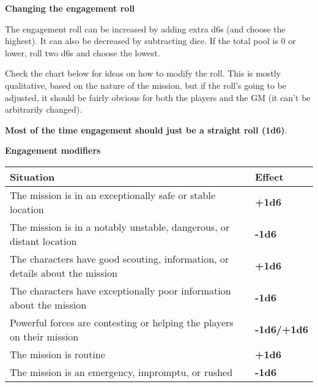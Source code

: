 \begin{center}
    \textbf{Changing the engagement roll}
\end{center}

The engagement roll can be increased by adding extra d6s (and choose the highest). It can also
be decreased by subtracting dice. If the total pool is 0 or lower, roll two d6s and choose the
lowest.

Check the chart below for ideas on how to modify the roll. This is mostly qualitative, based on
the nature of the mission, but if the roll’s going to be adjusted, it should be fairly obvious for both
the players and the GM (it can’t be arbitrarily changed).

\textbf{Most of the time engagement should just be a straight roll (1d6)}.
\begin{center}
    \textbf{Engagement modifiers}
\end{center}

\begin{center}
    \begin{tabular}{| l | l |}
    \hline
    \textbf{Situation} &  \textbf{Effect} \\ \hline
    The mission is in an exceptionally safe or stable location  & \textbf{+1d6} \\ \hline
    The mission is in a notably unstable, dangerous, or distant location & \textbf{-1d6} \\ \hline
    The characters have good scouting, information, or details about the mission  & \textbf{+1d6} \\ \hline
    The characters have exceptionally poor information about the mission & \textbf{-1d6} \\ \hline
    Powerful forces are contesting or helping the players on their mission  & \textbf{-1d6/+1d6} \\ \hline
    The mission is routine  & \textbf{+1d6} \\ \hline
    The mission is an emergency, impromptu, or rushed & \textbf{-1d6} \\ \hline
    \end{tabular}
\end{center}